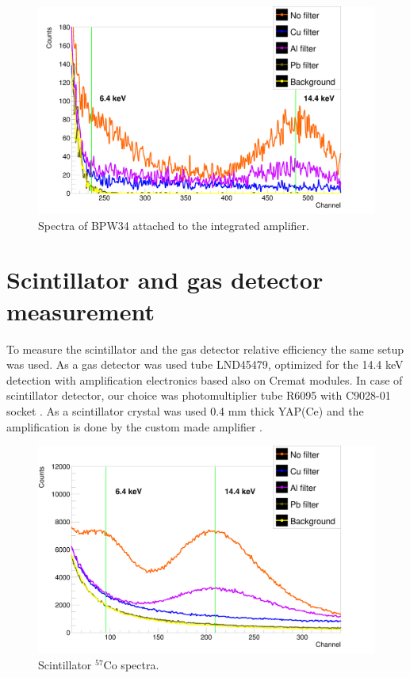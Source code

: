 \begin{figure}[H]
\centering
\includegraphics[scale=0.125, angle = 0]{./pictures/BPW34Spectre.png}
\caption{Spectra of BPW34 attached to the integrated amplifier.}
\label{BPW34 integrated amplifier spectra.}

\end{figure}


\section{Scintillator and gas detector measurement}
To measure the scintillator and the gas detector relative efficiency the same setup was used. As a gas detector was used tube LND45479, optimized for the 14.4 keV detection with amplification electronics based also on Cremat modules. In case of scintillator detector, our choice was photomultiplier tube R6095 \cite{R6095} with C9028-01 socket \cite{C9028}. As a scintillator crystal was used 0.4 mm thick YAP(Ce) and the amplification is done by the custom made amplifier \cite{STEJSKAL2019thesis}.

\begin{figure}[H]
\centering
\includegraphics[scale=0.125, angle = 0]{./pictures/PMTSpectre.png}
\caption{Scintillator $^{57}$Co spectra.}
\label{Scintillator detector spectra.}
\end{figure}

